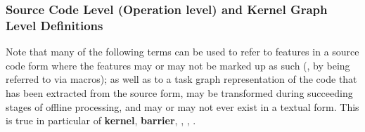 \documentclass{article}
\begin{document}
\subsubsection[Source Code and \shortAKG Level]{Source Code Level (Operation level) and Kernel Graph Level Definitions}
\label{sec:PUDCodeTerminology}


Note that many of the following terms can be used to refer to features in a source
code form where the features may or may not be marked up as such (\eg, by being
referred to via macros); as well as to a task graph representation of the
code that has been extracted from the source form, may be transformed
during succeeding stages of offline processing, and may or may not ever
exist in a textual form. This is true in particular of %
\textbf{kernel},
\textbf{barrier},
\textbf{\spelledoutDM},
\textbf{\OLAR},
\textbf{\actionnest}.
\end{document}
